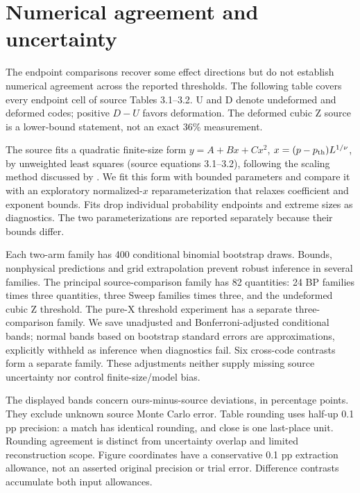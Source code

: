 \section{Numerical agreement and uncertainty}
The endpoint comparisons recover some effect directions but do not establish numerical agreement across the reported thresholds. The following table covers every endpoint cell of source Tables 3.1--3.2. U and D denote undeformed and deformed codes; positive $D-U$ favors deformation. The deformed cubic Z source is a lower-bound statement, not an exact 36\% measurement.
\begin{center}\end{center}
The source fits a quadratic finite-size form $y=A+Bx+Cx^2$, $x=(p-p_{\rm th})L^{1/\nu}$, by unweighted least squares (source equations 3.1--3.2), following the scaling method discussed by \citet{tuckett2020}. We fit this form with bounded parameters and compare it with an exploratory normalized-$x$ reparameterization that relaxes coefficient and exponent bounds. Fits drop individual probability endpoints and extreme sizes as diagnostics. The two parameterizations are reported separately because their bounds differ.

Each two-arm family has 400 conditional binomial bootstrap draws. Bounds, nonphysical predictions and grid extrapolation prevent robust inference in several families. The principal source-comparison family has 82 quantities: 24 BP families times three quantities, three Sweep families times three, and the undeformed cubic Z threshold. The pure-X threshold experiment has a separate three-comparison family. We save unadjusted and Bonferroni-adjusted conditional bands; normal bands based on bootstrap standard errors are approximations, explicitly withheld as inference when diagnostics fail. Six cross-code contrasts form a separate family. These adjustments neither supply missing source uncertainty nor control finite-size/model bias.


The displayed bands concern ours-minus-source deviations, in percentage points. They exclude unknown source Monte Carlo error. Table rounding uses half-up 0.1 pp precision: a match has identical rounding, and close is one last-place unit. Rounding agreement is distinct from uncertainty overlap and limited reconstruction scope. Figure coordinates have a conservative 0.1 pp extraction allowance, not an asserted original precision or trial error. Difference contrasts accumulate both input allowances.

